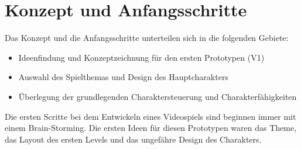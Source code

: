 \pagebreak

\section{Konzept und Anfangsschritte}
Das Konzept und die Anfangsschritte unterteilen sich in die folgenden Gebiete: 
\begin{itemize}
  \item Ideenfindung und Konzeptzeichnung für den ersten Prototypen (V1)
  \item Auswahl des Spielthemas und Design des Hauptcharakters
  \item Überlegung der grundlegenden Charaktersteuerung und Charakterfähigkeiten
\end{itemize}

Die ersten Scritte bei dem Entwickeln eines Videospiels sind beginnen immer mit einem Brain-Storming. Die ersten Ideen für diesen Prototypen waren das Theme, das Layout des ersten Levels und das ungefähre Design des Charakters.

